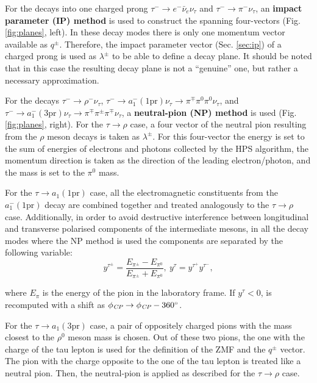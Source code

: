 For the decays into one charged prong $\tau^- \to e^- \bar{\nu}_e \nu_\tau$ and $\tau^- \to \pi^- \nu_\tau$, an \textbf{impact parameter (IP) method} is used to construct the spanning four-vectors (Fig. \ref{fig:planes}, left). In these decay modes there is only one momentum vector available as $q^\pm$. Therefore, the impact parameter vector (Sec. \ref{sec:ip}) of a charged prong is used as $\lambda^\pm$ to be able to define a decay plane. It should be noted that in this case the resulting decay plane is not a \enquote{genuine} one, but rather a necessary approximation.  

For the decays $\tau^- \to \rho^- \nu_\tau$, $\tau^- \to a_1^-(\text{1pr}) \nu_\tau \to \pi^\mp \pi^0  \pi^0 \nu_\tau$, and $\tau^- \to a_1^-(\text{3pr})\nu_\tau \to \pi^\mp \pi^\pm \pi^\mp \nu_\tau$, a \textbf{neutral-pion (NP) method} is used (Fig. \ref{fig:planes}, right). For the $\tau \to \rho$ case, a four vector of the neutral pion resulting from the $\rho$ meson decays is taken as $\lambda^\pm$. For this four-vector the energy is set to the sum of energies of electrons and photons collected by the HPS algorithm, the momentum direction is taken as the direction of the leading electron/photon, and the mass is set to the $\pi^0$ mass. 

For the $\tau \to a_1(\text{1pr})$ case, all the electromagnetic constituents from the $a_1^-(\text{1pr})$ decay are combined together and treated analogously to the $\tau \to \rho$ case. Additionally, in order to avoid destructive interference between longitudinal and transverse polarised components of the intermediate mesons, in all the decay modes where the NP method is used the components are separated by the following variable:
\begin{equation}
    y^{\tau^\pm} = \dfrac{E_{\pi^\pm} - E_{\pi^0}}{E_{\pi^\pm} + E_{\pi^0}}, ~y^\tau = y^{\tau^+}y^{\tau^-},
\end{equation}

where $E_\pi$ is the energy of the pion in the laboratory frame. If $y^\tau < 0$, \phicp is recomputed with a shift as $\phi_{\textit{CP}} \to \phi_{\textit{CP}} - 360^\circ$.

For the $\tau \to a_1(\text{3pr})$ case, a pair of oppositely charged pions with the mass closest to the $\rho^0$ meson mass is chosen. Out of these two pions, the one with the charge of the tau lepton is used for the definition of the ZMF and the $q^\pm$ vector. The pion with the charge opposite to the one of the tau lepton is treated like a neutral pion. Then, the neutral-pion is applied as described for the $\tau \to \rho$ case. 

